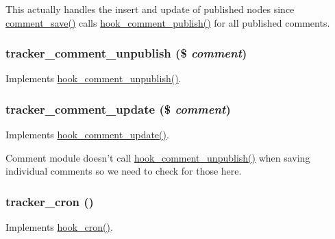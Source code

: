 This actually handles the insert and update of published nodes since \hyperlink{comment_8module_a4ef5d3d2161511e0d09a560fb5004e82}{comment\_\-save()} calls \hyperlink{group__hooks_ga4c4be9019e5cc7f92e8ccc03b595a64b}{hook\_\-comment\_\-publish()} for all published comments. \hypertarget{tracker_8module_affcdc2f73a4cc6a602507927d739fd94}{
\subsubsection[{tracker\_\-comment\_\-unpublish}]{\setlength{\rightskip}{0pt plus 5cm}tracker\_\-comment\_\-unpublish (\$ {\em comment})}}
\label{tracker_8module_affcdc2f73a4cc6a602507927d739fd94}
Implements \hyperlink{group__hooks_gaed97e1a1eaedd7b482f881ea2b8a3876}{hook\_\-comment\_\-unpublish()}. \hypertarget{tracker_8module_ae2eb7d292f5bc837380129a38cbe10ff}{
\subsubsection[{tracker\_\-comment\_\-update}]{\setlength{\rightskip}{0pt plus 5cm}tracker\_\-comment\_\-update (\$ {\em comment})}}
\label{tracker_8module_ae2eb7d292f5bc837380129a38cbe10ff}
Implements \hyperlink{group__hooks_ga63e0b41e7dbaadbf352b0a9c246d5ae5}{hook\_\-comment\_\-update()}.

Comment module doesn't call \hyperlink{group__hooks_gaed97e1a1eaedd7b482f881ea2b8a3876}{hook\_\-comment\_\-unpublish()} when saving individual comments so we need to check for those here. \hypertarget{tracker_8module_a8c6e69f3f4bb29bcae1b0b858393839c}{
\subsubsection[{tracker\_\-cron}]{\setlength{\rightskip}{0pt plus 5cm}tracker\_\-cron ()}}
\label{tracker_8module_a8c6e69f3f4bb29bcae1b0b858393839c}
Implements \hyperlink{group__hooks_gaf07f1e3d98112fc2ba6920cf7ee6fb16}{hook\_\-cron()}.

